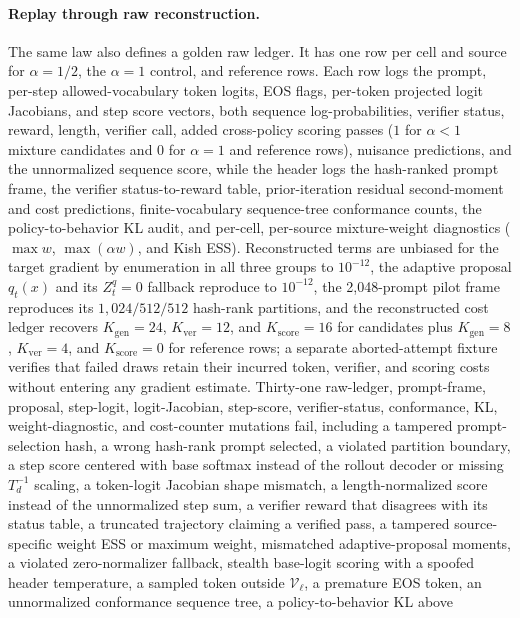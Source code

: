 \documentclass{article}
\begin{document}
\paragraph{Replay through raw reconstruction.}
The same law also defines a golden raw ledger. It has one row per cell and
source for $\alpha=1/2$, the $\alpha=1$ control, and reference rows. Each row
logs the prompt, per-step allowed-vocabulary token logits, EOS flags, per-token
projected logit Jacobians, and step
score vectors, both
sequence log-probabilities, verifier status, reward, length, verifier
call, added cross-policy scoring passes ($1$ for $\alpha<1$ mixture candidates
and $0$ for $\alpha=1$ and reference rows), nuisance
predictions, and the unnormalized sequence score, while the header logs the
hash-ranked prompt frame, the verifier status-to-reward table, prior-iteration residual
second-moment and cost predictions, finite-vocabulary sequence-tree conformance
counts, the policy-to-behavior KL audit, and per-cell, per-source mixture-weight
diagnostics ($\max w$, $\max(\alpha w)$, and Kish ESS). Reconstructed terms are unbiased
for the target gradient by enumeration in all three groups to $10^{-12}$, the
adaptive proposal $q_t(x)$ and its $Z_t^q=0$ fallback reproduce to $10^{-12}$,
the 2,048-prompt pilot frame reproduces its $1{,}024/512/512$ hash-rank
partitions,
and the reconstructed cost ledger recovers $K_{\mathrm{gen}}=24$,
$K_{\mathrm{ver}}=12$, and $K_{\mathrm{score}}=16$ for candidates plus
$K_{\mathrm{gen}}=8$, $K_{\mathrm{ver}}=4$, and $K_{\mathrm{score}}=0$ for
reference rows; a separate aborted-attempt fixture verifies that failed draws
retain their incurred token, verifier, and scoring costs without entering any
gradient estimate. Thirty-one raw-ledger, prompt-frame, proposal, step-logit,
logit-Jacobian, step-score, verifier-status, conformance, KL, weight-diagnostic,
and cost-counter mutations fail, including a tampered prompt-selection hash, a
wrong hash-rank prompt selected, a violated partition boundary, a step score
centered with base softmax instead of the rollout decoder or missing $T_d^{-1}$
scaling, a token-logit Jacobian shape mismatch, a
length-normalized score instead of the unnormalized step sum, a verifier reward
that disagrees with its status table, a truncated trajectory claiming a
verified pass, a tampered source-specific weight ESS or maximum weight, mismatched adaptive-proposal moments,
a violated zero-normalizer fallback, stealth base-logit scoring with a spoofed
header temperature, a sampled token outside $\mathcal V_\ell$, a premature EOS
token, an unnormalized conformance sequence tree, a policy-to-behavior KL above
\end{document}
